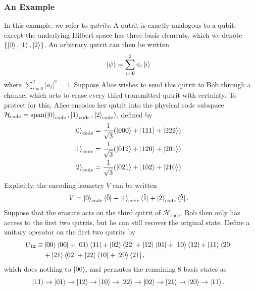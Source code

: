 \documentclass[12pt,a4paper]{report}
\numberwithin{equation}{section}
\newcommand{\ketbra}[2]{\ket{#1}\bra{#2}}
\newcommand{\ketbras}[1]{\ketbra{#1}{#1}}
\newcommand{\Hcode}{\mathcal{H}_{\text{code}}}
\theoremstyle{definition}
\theoremstyle{theorem}
\theoremstyle{theorem}
\theoremstyle{example}
\theoremstyle{definition}
\begin{document}
\subsubsection{An Example}
In this example, we refer to \textit{qutrits}. A qutrit is exactly analogous to a qubit, except the underlying Hilbert space has three basis elements, which we denote $\{\ket{0},\ket{1},\ket{2}\}$. An arbitrary qutrit can then be written
\begin{equation}
	\ket{\psi}=\sum_{i=0}^{2}a_{i}\ket{i}
\end{equation}
where $\sum_{i=0}^{2}|a_{i}|^{2}=1$. Suppose Alice wishes to send this qutrit to Bob through a channel which acts to erase every third transmitted qutrit with certainty. To protect for this, Alice encodes her qutrit into the physical code subspace $\Hcode=\text{span}(\ket{0}_{\text{code}},\ket{1}_{\text{code}},\ket{2}_{\text{code}})$, defined by
\begin{equation}
	\begin{aligned}
		\ket{0}_{\text{code}}&=\frac{1}{\sqrt{3}}(\ket{{000}}+\ket{{111}}+\ket{{222}})\\
		\ket{1}_{\text{code}}&=\frac{1}{\sqrt{3}}(\ket{{012}}+\ket{{120}}+\ket{{201}})\\
		\ket{2}_{\text{code}}&=\frac{1}{\sqrt{3}}(\ket{{021}}+\ket{{102}}+\ket{{210}})
	\end{aligned}.
\end{equation}
Explicitly, the encoding isometry $V$ can be written
\begin{equation}
	V=\ket{0}_{\text{code}}\bra{\tilde{0}}+\ket{1}_{\text{code}}\bra{\tilde{1}}+\ket{2}_{\text{code}}\bra{\tilde{2}}.
\end{equation}
Suppose that the erasure acts on the third qutrit of $\Hcode$. Bob then only has access to the first two qutrits, but he can still recover the original state. Define a unitary operator on the first two qutrits by
\begin{equation}\label{unitary}
	\begin{aligned}
		U_{12}\equiv&\ketbras{{00}}+\ketbra{{01}}{{11}}+\ketbra{{02}}{{22}}+\ketbra{{12}}{{01}}+\ketbra{{10}}{{12}}+\ketbra{{11}}{{20}}\\&+\ketbra{{21}}{{02}}+\ketbra{{22}}{{10}}+\ketbra{{20}}{{21}},
	\end{aligned}
\end{equation}
which does nothing to $\ket{{00}}$, and permutes the remaining 8 basis states as
\begin{equation}
	\ket{{11}}\to\ket{{01}}\to\ket{{12}}\to\ket{{10}}\to\ket{{22}}\to\ket{{02}}\to\ket{{21}}\to\ket{{20}}\to\ket{{11}}.
\end{equation}
\end{document}
